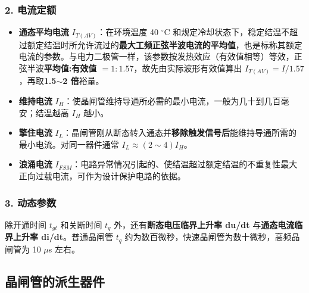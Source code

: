\subsubsection*{2. 电流定额}

\begin{itemize}
  \item \textbf{通态平均电流} $I_{T(AV)}$：在环境温度 40 $^\circ$C 和规定冷却状态下，稳定结温不超过额定结温时所允许流过的\textbf{最大工频正弦半波电流的平均值}，也是标称其额定电流的参数。与电力二极管一样，该参数按发热效应（有效值相等）等效，正弦半波\textbf{平均值:有效值 $=1:1.57$}，故先由实际波形有效值算出 $I_{T(AV)}=I/1.57$，再取\textbf{1.5$\sim$2 倍}裕量。
  \item \textbf{维持电流} $I_H$：使晶闸管维持导通所必需的最小电流，一般为几十到几百毫安；结温越高 $I_H$ 越小。
  \item \textbf{擎住电流} $I_L$：晶闸管刚从断态转入通态并\textbf{移除触发信号后}能维持导通所需的最小电流。对同一器件通常 $I_L\approx(2\sim4)I_H$。
  \item \textbf{浪涌电流} $I_{FSM}$：电路异常情况引起的、使结温超过额定结温的不重复性最大正向过载电流，可作为设计保护电路的依据。
\end{itemize}


\subsubsection*{3. 动态参数}

除开通时间 $t_{gt}$ 和关断时间 $t_q$ 外，还有\textbf{断态电压临界上升率 du/dt} 与\textbf{通态电流临界上升率 di/dt}。普通晶闸管 $t_q$ 约为数百微秒，快速晶闸管为数十微秒，高频晶闸管为 10 $\mu$s 左右。

\subsection{晶闸管的派生器件}

